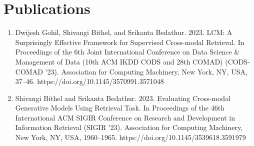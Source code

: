 \section{Publications}
\label{sec:publications}

\begin{enumerate}

\item Dwijesh Gohil, Shivangi Bithel, and Srikanta Bedathur. 2023. LCM: A Surprisingly Effective Framework for Supervised Cross-modal Retrieval. In Proceedings of the 6th Joint International Conference on Data Science \& Management of Data (10th ACM IKDD CODS and 28th COMAD) (CODS-COMAD '23). Association for Computing Machinery, New York, NY, USA, 37–46. https://doi.org/10.1145/3570991.3571048 ~\cite{dwijesh} \\

\item Shivangi Bithel and Srikanta Bedathur. 2023. Evaluating Cross-modal Generative Models Using Retrieval Task. In Proceedings of the 46th International ACM SIGIR Conference on Research and Development in Information Retrieval (SIGIR '23). Association for Computing Machinery, New York, NY, USA, 1960–1965. https://doi.org/10.1145/3539618.3591979 ~\cite{sbithel}

\end{enumerate}
